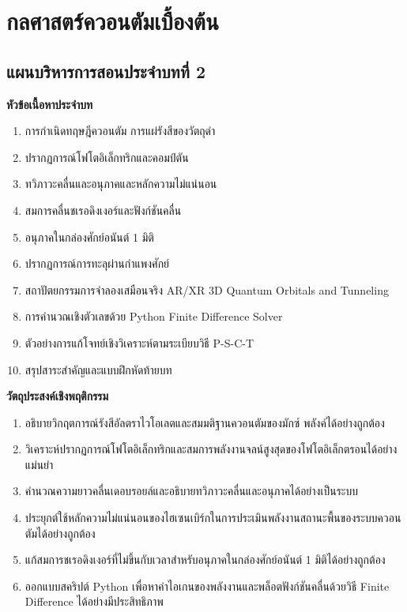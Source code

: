 \chapter{กลศาสตร์ควอนตัมเบื้องต้น}
\label{chap:quantum_mechanics}

\section*{แผนบริหารการสอนประจำบทที่ 2}

\begin{lessonplanbox}
\noindent\textbf{หัวข้อเนื้อหาประจำบท}
\begin{enumerate}
    \item การกำเนิดทฤษฎีควอนตัม การแผ่รังสีของวัตถุดำ
    \item ปรากฏการณ์โฟโตอิเล็กทริกและคอมป์ตัน
    \item ทวิภาวะคลื่นและอนุภาคและหลักความไม่แน่นอน
    \item สมการคลื่นชเรอดิงเงอร์และฟังก์ชันคลื่น
    \item อนุภาคในกล่องศักย์อนันต์ 1 มิติ
    \item ปรากฏการณ์การทะลุผ่านกำแพงศักย์
    \item สถาปัตยกรรมการจำลองเสมือนจริง AR/XR 3D Quantum Orbitals and Tunneling
    \item การคำนวณเชิงตัวเลขด้วย Python Finite Difference Solver
    \item ตัวอย่างการแก้โจทย์เชิงวิเคราะห์ตามระเบียบวิธี P-S-C-T
    \item สรุปสาระสำคัญและแบบฝึกหัดท้ายบท
\end{enumerate}

\vspace{0.4em}
\noindent\textbf{วัตถุประสงค์เชิงพฤติกรรม}
\begin{enumerate}
    \item อธิบายวิกฤตการณ์รังสีอัลตราไวโอเลตและสมมติฐานควอนตัมของมักซ์ พลังค์ได้อย่างถูกต้อง
    \item วิเคราะห์ปรากฏการณ์โฟโตอิเล็กทริกและสมการพลังงานจลน์สูงสุดของโฟโตอิเล็กตรอนได้อย่างแม่นยำ
    \item คำนวณความยาวคลื่นเดอบรอยล์และอธิบายทวิภาวะคลื่นและอนุภาคได้อย่างเป็นระบบ
    \item ประยุกต์ใช้หลักความไม่แน่นอนของไฮเซนเบิร์กในการประเมินพลังงานสถานะพื้นของระบบควอนตัมได้อย่างถูกต้อง
    \item แก้สมการชเรอดิงเงอร์ที่ไม่ขึ้นกับเวลาสำหรับอนุภาคในกล่องศักย์อนันต์ 1 มิติได้อย่างถูกต้อง
    \item ออกแบบสคริปต์ Python เพื่อหาค่าไอเกนของพลังงานและพล็อตฟังก์ชันคลื่นด้วยวิธี Finite Difference ได้อย่างมีประสิทธิภาพ
\end{enumerate}


\end{lessonplanbox}
